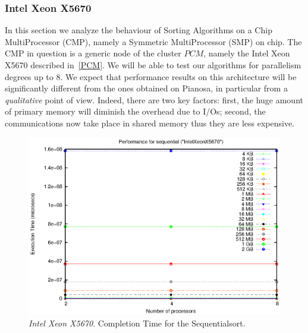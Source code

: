 \subsubsection{Intel Xeon X5670}
In this section we analyze the behaviour of Sorting Algorithms on a Chip MultiProcessor (CMP), namely a Symmetric MultiProcessor (SMP) on chip. The CMP in question is a generic node of the cluster $PCM$, namely the Intel Xeon X5670 described in~\ref{PCM}. We will be able to test our algorithms for parallelism degrees up to 8. We expect that performance results on this architecture will be significantly different from the ones obtained on Pianosa, in particular from a \textit{qualitative} point of view. Indeed, there are two key factors: first, the huge amount of primary memory will diminish the overhead due to I/Os; second, the communications now take place in shared memory thus they are less expensive.

\begin{figure}[t]
	\begin{center}
		\includegraphics[scale=0.6]{plots/test_01_IntelXeonX5670/NxTxM/sequential_IntelXeonX5670_NxTxM}
	\end{center}
  	\caption{\textit{Intel Xeon X5670}. Completion Time for the Sequentialsort.}
  	\label{sequential-IntelXeonX5670}
\end{figure}

